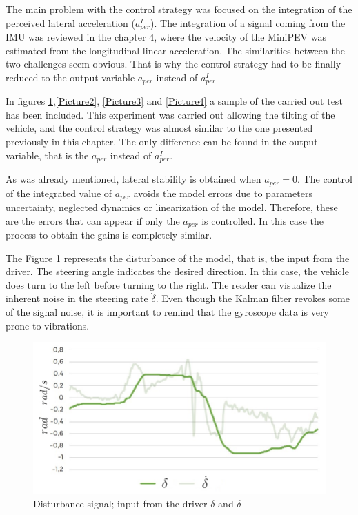 The main problem with the control strategy was focused on the integration of the perceived lateral acceleration ($a_{per}^{I}$). The integration of a signal coming from the IMU was reviewed in the chapter 4, where the velocity of the MiniPEV was estimated from the longitudinal linear acceleration. The similarities between the two challenges seem obvious. That is why the control strategy had to be finally reduced to the output variable  $a_{per}$ instead of $a_{per}^{I}$

In figures \ref{Picture1},\ref{Picture2}, \ref{Picture3} and \ref{Picture4} a sample of the carried out test has been included. This experiment was carried out allowing the tilting of the vehicle, and the control strategy was almost similar to the one presented previously in this chapter. The only difference can be found in the output variable, that is the $a_{per}$ instead of $a_{per}^{I}$. 

As was already mentioned, lateral stability is obtained when $a_{per}=0$. The control of the integrated value of $a_{per}$ avoids the model errors due to parameters uncertainty, neglected dynamics or linearization of the model. Therefore, these are the errors that can appear if only the $a_{per}$ is controlled. In this case the process to obtain the gains is completely similar.

The Figure \ref{Picture1} represents the disturbance of the model, that is, the input from the driver. The steering angle indicates the desired direction. In this case, the vehicle does turn to the left before turning to the right. The reader can visualize the inherent noise in the steering rate $\dot{\delta}$. Even though the Kalman filter revokes some of the signal noise, it is important to remind that the gyroscope data is very prone to vibrations.
\begin{figure}[!h]
	\includegraphics[width=1\linewidth]{figs/06/tests/Picture1b}
	\caption{Disturbance signal; input from the driver $\delta$ and $\dot{\delta}$}
	\label{Picture1}
\end{figure}
\newpage

